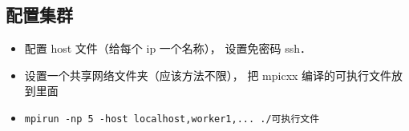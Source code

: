 \subsection{配置集群}
\begin{itemize}
\item 配置 host 文件（给每个 ip 一个名称）， 设置免密码 ssh．
\item 设置一个共享网络文件夹（应该方法不限）， 把 mpicxx 编译的可执行文件放到里面
\item \verb|mpirun -np 5 -host localhost,worker1,... ./可执行文件|
\end{itemize}
